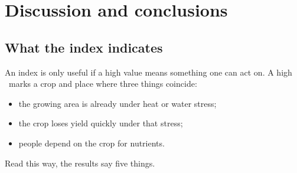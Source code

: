 \section{Discussion and conclusions}\label{sec:discussion}

\subsection{What the index indicates}
An index is only useful if a high value means something one can act on. A high \Fd\ marks a crop and place where
three things coincide:
\begin{itemize}
\item the growing area is already under heat or water stress;
\item the crop loses yield quickly under that stress;
\item people depend on the crop for nutrients.
\end{itemize}
Read this way, the results say five things.
